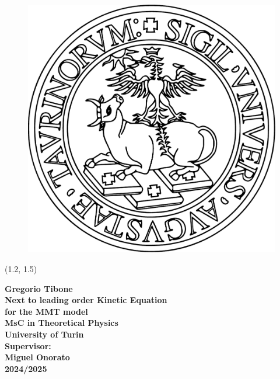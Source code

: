 \begin{titlepage}
    
    \begin{figure}[!htb]
        \raggedleft
        \vspace{2cm}
        \includegraphics[width=2\textwidth]{images/Unito-logo.pdf}  
    \end{figure}
    
    \begin{textblock}{15}(1.2, 1.5)  %
        \raggedright
        \large \bfseries Gregorio Tibone \\
        \Huge Next to leading order Kinetic Equation\\ for the MMT model \\[1cm] %
        \Large MsC in Theoretical Physics \\
        \Large University of Turin \\[1cm]  
        \large Supervisor: \\
        \large Miguel Onorato \\[1cm]
        \normalsize 2024/2025  \\
    \end{textblock}
\end{titlepage}
